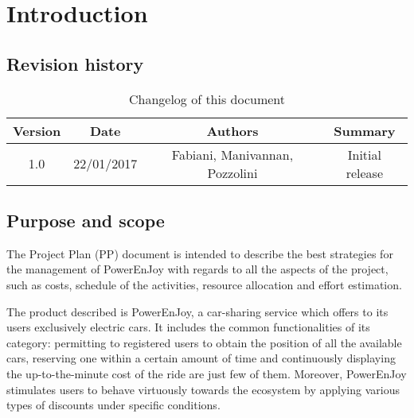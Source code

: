 \chapter{Introduction}

\section{Revision history}
\begin{table}[h]
	\centering
	\begin{tabular}{|c|c|c|c|}
		\hline
		\textbf{Version} & \textbf{Date} & \textbf{Authors} & \textbf{Summary} \\
		\hline
		1.0 & 22/01/2017 & Fabiani, Manivannan, Pozzolini & Initial release  \\
		\hline
	\end{tabular}

	\caption{Changelog of this document}
	\label{tab:revision_history}
\end{table}

\section{Purpose and scope}
The Project Plan (PP) document is intended to describe the best strategies for the management of PowerEnJoy with regards to all the aspects of the project, such as costs, schedule of the activities, resource allocation and effort estimation.

The product described is PowerEnJoy, a car-sharing service which offers to its users exclusively electric cars. It includes the common functionalities of its category: permitting to registered users to obtain the position of all the available cars, reserving one within a certain amount of time and continuously displaying the up-to-the-minute cost of the ride are just few of them. Moreover, PowerEnJoy stimulates users to behave virtuously towards the ecosystem by applying various types of discounts under specific conditions.

